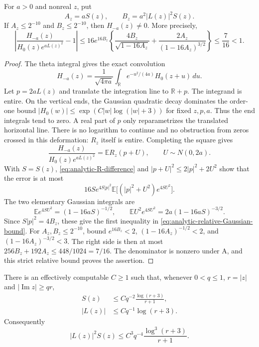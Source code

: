 \begin{lemma}
\label{lem:analytic-gaussian-nonzero}
For $a>0$ and nonreal $z$, put
\[
                A_z=aS(z),\qquad B_z=a^2|L(z)|^2S(z).
\]
If $A_z\le2^{-10}$ and $B_z\le2^{-10}$, then $H_{-a}(z)\ne0$.
More precisely,
\begin{equation}\label{eq:analytic-relative-Gaussian-bound}
 \left|\frac{H_{-a}(z)}{H_0(z)e^{aL(z)^2}}-1\right|
 \le16e^{16B_z}
 \left\{\frac{4B_z}{\sqrt{1-16A_z}}+
             \frac{2A_z}{(1-16A_z)^{3/2}}\right\}
 \le\frac7{16}<1.
\end{equation}
\end{lemma}

\begin{proof}
The theta integral gives the exact convolution
\[
 H_{-a}(z)=\frac1{\sqrt{4\pi a}}
             \int_{\mathbb R}e^{-u^2/(4a)}H_0(z+u)\,du.
\]
Let $p=2aL(z)$ and translate the integration line to
$\mathbb R+p$. The integrand is entire. On the vertical ends,
the Gaussian quadratic decay dominates the order-one bound
$|H_0(w)|\le\exp(C|w|\log(|w|+3))$ for fixed $z,p,a$.
Thus the end integrals tend to zero. A real part of $p$ only
reparametrizes the translated horizontal line. There is no
logarithm to continue and no obstruction from zeros crossed
in this deformation: $R_z$ itself is entire.
Completing the square gives
\[
 \frac{H_{-a}(z)}{H_0(z)e^{aL(z)^2}}
          =\mathbb E R_z(p+U),\qquad U\sim N(0,2a).
\]
With $S=S(z)$, \eqref{eq:analytic-R-difference} and
$|p+U|^2\le2|p|^2+2U^2$ show that the error is at most
\[
 16S e^{4S|p|^2}
       \mathbb E\bigl[(|p|^2+U^2)e^{4SU^2}\bigr].
\]
The two elementary Gaussian integrals are
\[
 \mathbb E e^{4SU^2}=(1-16aS)^{-1/2},\qquad
 \mathbb E U^2e^{4SU^2}
                       =2a(1-16aS)^{-3/2}.
\]
Since $S|p|^2=4B_z$, these give the first inequality in
\eqref{eq:analytic-relative-Gaussian-bound}.
For $A_z,B_z\le2^{-10}$, bound $e^{16B_z}<2$,
$(1-16A_z)^{-1/2}<2$, and
$(1-16A_z)^{-3/2}<3$. The right side is then at most
$256B_z+192A_z\le448/1024=7/16$.
The denominator is nonzero under A, and this strict relative
bound proves the assertion.
\end{proof}

\begin{lemma}
\label{lem:analytic-cone-logderivative}
There is an effectively computable $C\ge1$ such that, whenever
$0<q\le1$, $r=|z|$ and $|\operatorname{Im}z|\ge qr$,
\begin{align}
 S(z)&\le Cq^{-2}\frac{\log(r+3)}{r+1},
                 \label{eq:analytic-S-cone}\\
 |L(z)|&\le Cq^{-1}\log(r+3).
                 \label{eq:analytic-L-cone}
\end{align}
Consequently
\[
 |L(z)|^2S(z)
       \le C^3q^{-4}\frac{\log^3(r+3)}{r+1}.
\]
\end{lemma}

